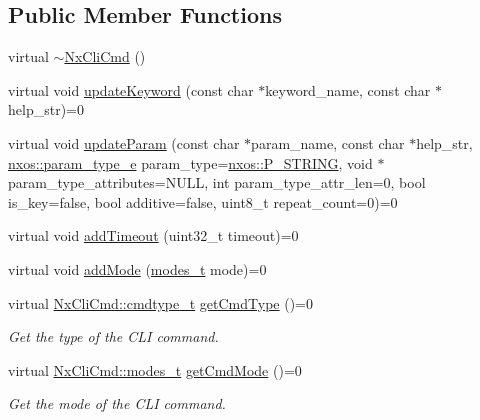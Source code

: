 \subsection*{Public Member Functions}
\begin{DoxyCompactItemize}
\item 
virtual \mbox{\hyperlink{classnxos_1_1_nx_cli_cmd_a3678e859df1bd42824f5b9f9f1de3b08}{$\sim$\+Nx\+Cli\+Cmd}} ()
\item 
virtual void \mbox{\hyperlink{classnxos_1_1_nx_cli_cmd_aa698fdd1026739307e0710e2948f19f5}{update\+Keyword}} (const char $\ast$keyword\+\_\+name, const char $\ast$help\+\_\+str)=0
\item 
virtual void \mbox{\hyperlink{classnxos_1_1_nx_cli_cmd_abc9244b0bcf22142b5d784c06a6aa91b}{update\+Param}} (const char $\ast$param\+\_\+name, const char $\ast$help\+\_\+str, \mbox{\hyperlink{namespacenxos_ad220d5ba6a2a5d7edeab55cb89d309ea}{nxos\+::param\+\_\+type\+\_\+e}} param\+\_\+type=\mbox{\hyperlink{namespacenxos_ad220d5ba6a2a5d7edeab55cb89d309eaa351d79231fdcee1f39ac930bf6cc56ea}{nxos\+::\+P\+\_\+\+S\+T\+R\+I\+NG}}, void $\ast$param\+\_\+type\+\_\+attributes=N\+U\+LL, int param\+\_\+type\+\_\+attr\+\_\+len=0, bool is\+\_\+key=false, bool additive=false, uint8\+\_\+t repeat\+\_\+count=0)=0
\item 
virtual void \mbox{\hyperlink{classnxos_1_1_nx_cli_cmd_ad4ebfd3ce0e68266bbc22bb4bc7dad0b}{add\+Timeout}} (uint32\+\_\+t timeout)=0
\item 
virtual void \mbox{\hyperlink{classnxos_1_1_nx_cli_cmd_a38260da2d6b7a227c4dd027521205c0b}{add\+Mode}} (\mbox{\hyperlink{classnxos_1_1_nx_cli_cmd_a72999b2e8f2995bbb19be346d875e3ce}{modes\+\_\+t}} mode)=0
\item 
virtual \mbox{\hyperlink{classnxos_1_1_nx_cli_cmd_a82ed104f13c7859b24d3c0527f706be1}{Nx\+Cli\+Cmd\+::cmdtype\+\_\+t}} \mbox{\hyperlink{classnxos_1_1_nx_cli_cmd_ab9dce490e4854f1160ba08fdc646bd37}{get\+Cmd\+Type}} ()=0
\begin{DoxyCompactList}\small\item\em Get the type of the C\+LI command. \end{DoxyCompactList}\item 
virtual \mbox{\hyperlink{classnxos_1_1_nx_cli_cmd_a72999b2e8f2995bbb19be346d875e3ce}{Nx\+Cli\+Cmd\+::modes\+\_\+t}} \mbox{\hyperlink{classnxos_1_1_nx_cli_cmd_a8ac3fe47522ba60987babb8c830153ff}{get\+Cmd\+Mode}} ()=0
\begin{DoxyCompactList}\small\item\em Get the mode of the C\+LI command. \end{DoxyCompactList}\item 

\end{DoxyCompactItemize}
